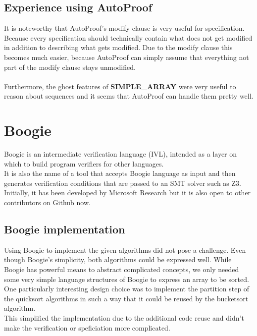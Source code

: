 \documentclass{report}
\begin{document}
\subsection{Experience using AutoProof}

It is noteworthy that AutoProof's modify clause is very useful for specification.
Because every specification should technically contain what does not get modified
in addition to describing what gets modified. Due to the modify clause this
becomes much easier, because AutoProof can simply assume that everything not part
of the modify clause stays unmodified.
\\
\\
Furthermore, the ghost features of \textbf{SIMPLE\_ARRAY} were very useful to
reason about sequences and it seems that AutoProof can handle them pretty well.

\section{Boogie}
\label{s:boogie}
Boogie is an intermediate verification language (IVL), intended as a layer on which to build program verifiers for other languages\cite{boogiegithub}.\\
It is also the name of a tool that accepts Boogie language as input and then generates verification conditions that are passed to an SMT solver such as Z3\cite{z3}.\\
Initially, it has been developed by Microsoft Research but it is also open to other contributors on Github now.

\subsection{Boogie implementation}

Using Boogie to implement the given algorithms did not pose a challenge.
Even though Boogie's simplicity, both algorithms could be expressed well.
While Boogie has powerful means to abstract complicated concepts, we only
needed some very simple language structures of Boogie to express an array to be sorted.\\
One particularly interesting design choice was to implement the partition step
of the quicksort algorithms in such a way that it could be reused by the bucketsort algorithm.\\
This simplified the implementation due to the additional code reuse and didn't
make the verification or speficiation more complicated.
\end{document}
